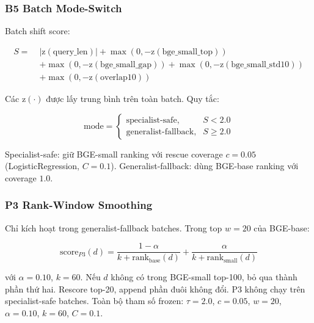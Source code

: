 \subsubsection{B5 Batch Mode-Switch}
\label{sec:method:b5}

Batch shift score:

\begin{equation}
\begin{aligned}
S = \; &|\mathrm{z}(\text{query\_len})|
       + \max(0, -\mathrm{z}(\text{bge\_small\_top})) \\
       &+ \max(0, -\mathrm{z}(\text{bge\_small\_gap}))
       + \max(0, -\mathrm{z}(\text{bge\_small\_std10})) \\
       &+ \max(0, -\mathrm{z}(\text{overlap10}))
\end{aligned}
\label{eq:shift-score}
\end{equation}

Các $\mathrm{z}(\cdot)$ được lấy trung bình trên toàn batch. Quy tắc:

\begin{equation}
\text{mode} = \begin{cases}
  \text{specialist-safe},     & S < 2.0 \\
  \text{generalist-fallback}, & S \ge 2.0
\end{cases}
\label{eq:mode-decision}
\end{equation}

Specialist-safe: giữ BGE-small ranking với rescue coverage $c = 0.05$ (LogisticRegression, $C=0.1$).
Generalist-fallback: dùng BGE-base ranking với coverage $1.0$.

\subsubsection{P3 Rank-Window Smoothing}
\label{sec:method:p3}

Chỉ kích hoạt trong generalist-fallback batches. Trong top $w=20$ của BGE-base:

\begin{equation}
  \text{score}_{P3}(d) =
  \frac{1-\alpha}{k + \text{rank}_{\text{base}}(d)}
  + \frac{\alpha}{k + \text{rank}_{\text{small}}(d)}
  \label{eq:p3-score}
\end{equation}

với $\alpha=0.10$, $k=60$. Nếu $d$ không có trong BGE-small top-100, bỏ qua thành phần thứ hai. Rescore
top-20, append phần đuôi không đổi. P3 không chạy trên specialist-safe batches. Toàn bộ tham số frozen:
$\tau=2.0$, $c=0.05$, $w=20$, $\alpha=0.10$, $k=60$, $C=0.1$.
